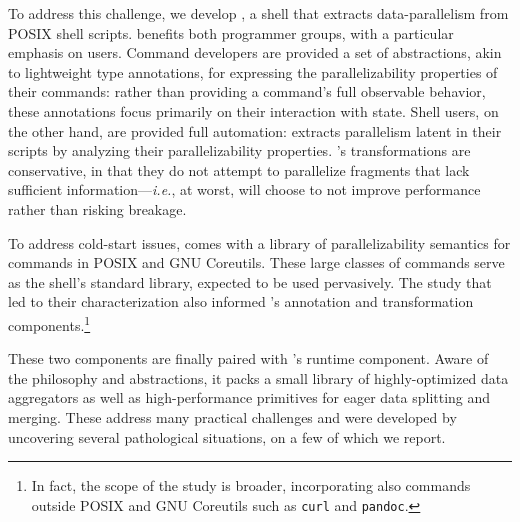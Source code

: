 \documentclass[letterpaper,twocolumn,10pt]{article}
\newcommand{\ie}{{\em i.e.}, }
\newcommand{\ttt}[1]{\texttt{#1}}
\newcommand{\nv}[1]{[{\color{cyan}nv: #1}]}
\newcommand{\kk}[1]{[{\color{magenta}kk: #1}]}
\begin{document}
To address this challenge, we develop \sys, a shell that extracts data-parallelism from POSIX shell scripts.
\sys benefits both programmer groups, %
  with a particular emphasis on users.
Command developers are provided a set of abstractions, akin to lightweight type annotations, for expressing the parallelizability properties of their commands:
  rather than providing a command's full observable behavior, these annotations focus primarily on their interaction with state.
Shell users, on the other hand, are provided full automation:
  \sys extracts parallelism latent in their scripts by analyzing their parallelizability properties. %
\sys's transformations are conservative, in that they do not attempt to parallelize fragments that lack sufficient information---\ie at worst, \sys will choose to not improve performance rather than risking breakage.

To address cold-start issues, \sys comes with a library of parallelizability semantics for commands in POSIX and GNU Coreutils.
These large classes of commands serve as the shell's standard library, expected to be used pervasively. %
The study that led to their characterization also informed \sys's annotation and transformation components.\footnote{
  In fact, the scope of the study is broader, incorporating also commands outside POSIX and GNU Coreutils such as \ttt{curl} and \ttt{pandoc}.
}

These two components are finally paired with \sys's runtime component.
Aware of the \unix philosophy and abstractions, it packs a small library of highly-optimized data aggregators as well as high-performance primitives for eager data splitting and merging.
These address many practical challenges %
  and were developed by uncovering several pathological situations, on a few of which we report.
\end{document}
